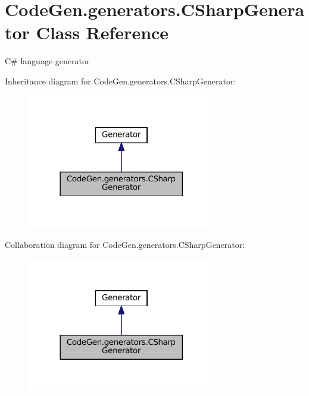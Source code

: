 \hypertarget{classCodeGen_1_1generators_1_1CSharpGenerator}{}\section{Code\+Gen.\+generators.\+C\+Sharp\+Generator Class Reference}
\label{classCodeGen_1_1generators_1_1CSharpGenerator}


C\# language generator  




Inheritance diagram for Code\+Gen.\+generators.\+C\+Sharp\+Generator\+:
\nopagebreak
\begin{figure}[H]
\begin{center}
\leavevmode
\includegraphics[width=234pt]{classCodeGen_1_1generators_1_1CSharpGenerator__inherit__graph}
\end{center}
\end{figure}


Collaboration diagram for Code\+Gen.\+generators.\+C\+Sharp\+Generator\+:
\nopagebreak
\begin{figure}[H]
\begin{center}
\leavevmode
\includegraphics[width=234pt]{classCodeGen_1_1generators_1_1CSharpGenerator__coll__graph}
\end{center}
\end{figure}
